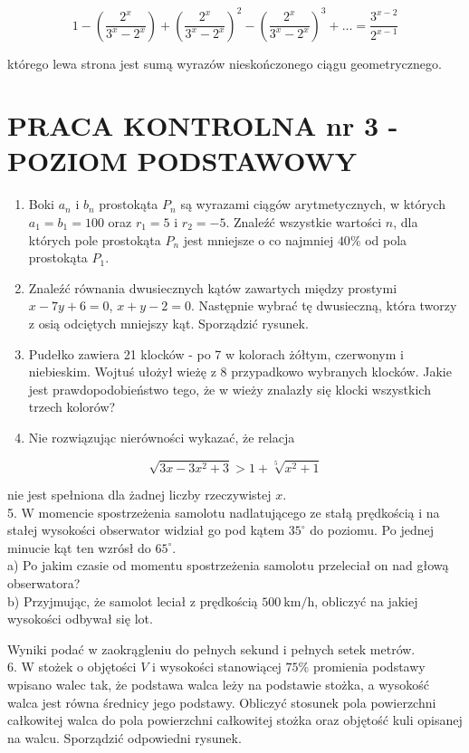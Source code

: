 \documentclass[10pt]{article}
\begin{document}
$$
1-\left(\frac{2^{x}}{3^{x}-2^{x}}\right)+\left(\frac{2^{x}}{3^{x}-2^{x}}\right)^{2}-\left(\frac{2^{x}}{3^{x}-2^{x}}\right)^{3}+\ldots=\frac{3^{x-2}}{2^{x-1}}
$$

którego lewa strona jest sumą wyrazów nieskończonego ciągu geometrycznego.

\section*{PRACA KONTROLNA nr 3 -POZIOM PODSTAWOWY}
\begin{enumerate}
  \item Boki $a_{n}$ i $b_{n}$ prostokąta $P_{n}$ są wyrazami ciągów arytmetycznych, w których $a_{1}=b_{1}=100$ oraz $r_{1}=5$ i $r_{2}=-5$. Znaleźć wszystkie wartości $n$, dla których pole prostokąta $P_{n}$ jest mniejsze o co najmniej $40 \%$ od pola prostokąta $P_{1}$.
  \item Znaleźć równania dwusiecznych kątów zawartych między prostymi $x-7 y+6=0$, $x+y-2=0$. Następnie wybrać tę dwusieczną, która tworzy z osią odciętych mniejszy kąt. Sporządzić rysunek.
  \item Pudełko zawiera 21 klocków - po 7 w kolorach żółtym, czerwonym i niebieskim. Wojtuś ułożył wieżę z 8 przypadkowo wybranych klocków. Jakie jest prawdopodobieństwo tego, że w wieży znalazły się klocki wszystkich trzech kolorów?
  \item Nie rozwiązując nierówności wykazać, że relacja
\end{enumerate}

$$
\sqrt{3 x-3 x^{2}+3}>1+\sqrt[5]{x^{2}+1}
$$

nie jest spełniona dla żadnej liczby rzeczywistej $x$.\\
5. W momencie spostrzeżenia samolotu nadlatującego ze stałą prędkością i na stałej wysokości obserwator widział go pod kątem $35^{\circ}$ do poziomu. Po jednej minucie kąt ten wzrósł do $65^{\circ}$.\\
a) Po jakim czasie od momentu spostrzeżenia samolotu przeleciał on nad głową obserwatora?\\
b) Przyjmując, że samolot leciał z prędkością $500 \mathrm{~km} / \mathrm{h}$, obliczyć na jakiej wysokości odbywał się lot.

Wyniki podać w zaokrągleniu do pełnych sekund i pełnych setek metrów.\\
6. W stożek o objętości $V$ i wysokości stanowiącej $75 \%$ promienia podstawy wpisano walec tak, że podstawa walca leży na podstawie stożka, a wysokość walca jest równa średnicy jego podstawy. Obliczyć stosunek pola powierzchni całkowitej walca do pola powierzchni całkowitej stożka oraz objętość kuli opisanej na walcu. Sporządzić odpowiedni rysunek.
\end{document}
